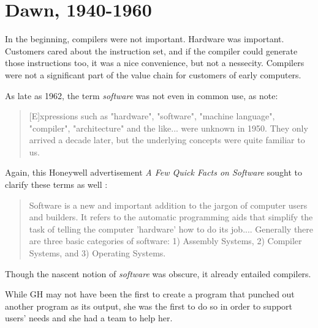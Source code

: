 \chapter{Dawn, 1940-1960}

In the beginning, compilers were not important.
Hardware was important.
Customers cared about the instruction set,
and if the compiler could generate those instructions too,
it was a nice convenience, but not a nessecity.
Compilers were not a significant part of the value chain for customers of early computers.

As late as 1962, the term \textit{software} was not even in common use, as \citeauthor{the_first_computers_2002} note\cite{the_first_computers_2002}:

\begin{quotation}
[E]xpressions such as "hardware", "software", "machine language", "compiler",
"architecture" and the like... were unknown in 1950. They only arrived a decade
later, but the underlying concepts were quite familiar to us.
\end{quotation}

Again, this Honeywell advertisement \textit{A Few Quick Facts on Software} sought to clarify these terms as well \cite[ch.5]{new_history_of_modern_computing}:

\begin{quotation}
Software is a new and important addition to the jargon of computer users and builders.
It refers to the automatic programming aids that simplify the task of telling the computer 'hardware' how to do its job....
Generally there are three basic categories of software:
1) Assembly Systems, 2) Compiler Systems, and 3) Operating Systems.
\end{quotation}

Though the nascent notion of \textit{software} was obscure, it already entailed compilers.

While GH may not have been the first to create a program that
punched out another program as its output, she was the first to
do so in order to support users' needs and she had a team to help her.


